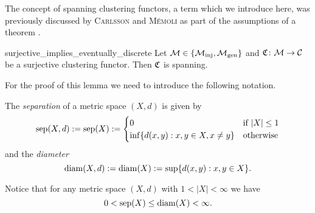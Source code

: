 The concept of spanning clustering functors, a term which we introduce here, was previously discussed by \textsc{Carlsson} and \textsc{M\'emoli} as part of the assumptions of a theorem \cite[Thm.~6.4]{Carlsson2010}.

\begin{lemma}{}{surjective_implies_eventually_discrete}
    Let $\mathcal{M} \in \{{\mathcal{M}_\mathrm{inj}}, {\mathcal{M}_\mathrm{gen}}\}$ and $\mathfrak{C}\colon \mathcal{M} \to \mathcal{C}$ be a surjective clustering functor. Then $\mathfrak{C}$ is spanning.
\end{lemma}

For the proof of this lemma we need to introduce the following notation.

\begin{definition}{}{}
    The \emph{separation} of a metric space $(X,d)$ is given by
    \begin{equation*}
    \mathrm{sep}(X,d) := \mathrm{sep}(X) := \begin{cases}
        0 & \text{if } |X| \le 1\\
        \inf\{d(x,y): x,y \in X, x \neq y\} & \text{otherwise}
    \end{cases}
    \end{equation*}
    and the \emph{diameter}
    \begin{equation*}
    \mathrm{diam}(X,d) := \mathrm{diam}(X) := \sup\{d(x,y): x,y \in X\}.
    \end{equation*}
\end{definition}

Notice that for any metric space $(X,d)$ with $1 < |X| < \infty$ we have
$$
0 < \mathrm{sep}(X) \leq \mathrm{diam}(X) < \infty.
$$

